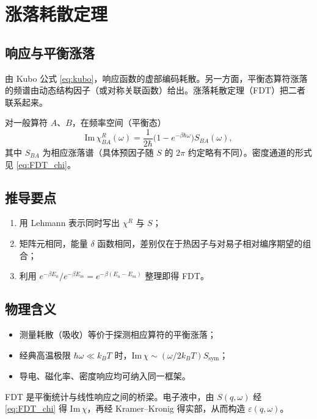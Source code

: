 \section{涨落耗散定理}

\subsection{响应与平衡涨落}

由 Kubo 公式 \eqref{eq:kubo}，响应函数的虚部编码耗散。另一方面，平衡态算符涨落的频谱由动态结构因子（或对称关联函数）给出。涨落耗散定理（FDT）把二者联系起来。

对一般算符 $A$、$B$，在频率空间（平衡态）
\begin{equation}
  \mathrm{Im}\,\chi^R_{BA}(\omega)
  =\frac{1}{2\hbar}
  \bigl(1-e^{-\beta\hbar\omega}\bigr)
  S_{BA}(\omega),
\label{eq:FDT_gen}
\end{equation}
其中 $S_{BA}$ 为相应涨落谱（具体预因子随 $S$ 的 $2\pi$ 约定略有不同）。密度通道的形式见 \eqref{eq:FDT_chi}。

\subsection{推导要点}

\begin{enumerate}
  \item 用 Lehmann 表示同时写出 $\chi^R$ 与 $S$；
  \item 矩阵元相同，能量 $\delta$ 函数相同，差别仅在于热因子与对易子相对编序期望的组合；
  \item 利用 $e^{-\beta E_n}/e^{-\beta E_m}=e^{-\beta(E_n-E_m)}$ 整理即得 FDT。
\end{enumerate}

\subsection{物理含义}

\begin{itemize}
  \item 测量耗散（吸收）等价于探测相应算符的平衡涨落；
  \item 经典高温极限 $\hbar\omega\ll k_BT$ 时，$\mathrm{Im}\,\chi\sim(\omega/2k_BT)S_{\mathrm{sym}}$；
  \item 导电、磁化率、密度响应均可纳入同一框架。
\end{itemize}

\begin{note}
FDT 是平衡统计与线性响应之间的桥梁。电子液中，由 $S(q,\omega)$ 经 \eqref{eq:FDT_chi} 得 $\mathrm{Im}\,\chi$，再经 Kramer--Kronig 得实部，从而构造 $\varepsilon(q,\omega)$。
\end{note}
